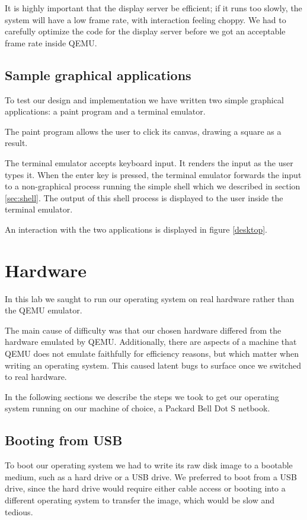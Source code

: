\documentclass{report}
\begin{document}
It is highly important that the display server be efficient; if it runs too
slowly, the system will have a low frame rate, with interaction feeling
choppy. We had to carefully optimize the code for the display server before
we got an acceptable frame rate inside QEMU.



\section{Sample graphical applications}
To test our design and implementation we have written two simple graphical
applications: a paint program and a terminal emulator. 

The paint program allows the user to click its canvas, drawing a square as a
result.

The terminal emulator accepts keyboard input. It renders the input as the user
types it. When the enter key is pressed, the terminal emulator forwards the
input to a non-graphical process running the simple shell which we described
in section \ref{sec:shell}. The output of this shell process is displayed to
the user inside the terminal emulator.

An interaction with the two applications is displayed in figure \ref{desktop}.








\chapter{Hardware}
In this lab we saught to run our operating system on real hardware rather than
the QEMU emulator.

The main cause of difficulty was that our chosen hardware differed from the
hardware emulated by QEMU. Additionally, there are aspects of a machine that
QEMU does not emulate faithfully for efficiency reasons, but which matter when
writing an operating system. This caused latent bugs to surface once we
switched to real hardware.

In the following sections we describe the steps we took to get our operating
system running on our machine of choice, a Packard Bell Dot S netbook.


\section{Booting from USB}
To boot our operating system we had to write its raw disk image to a bootable
medium, such as a hard drive or a USB drive. We preferred to boot from a USB
drive, since the hard drive would require either cable access or booting into
a different operating system to transfer the image, which would be slow and
tedious.
\end{document}
